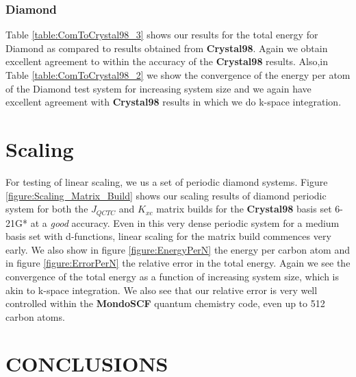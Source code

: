 \commentoutA{\documentclass[prb,aps,twocolumn,showpacs,twocolumngrid,superbib]{revtex4}}
\begin{document}
\subsubsection{Diamond}

Table \ref{table:ComToCrystal98_3} shows our results for the total
energy for Diamond as compared to results obtained from \textbf{Crystal98}.
Again we obtain excellent agreement to within the accuracy of the
\textbf{Crystal98} results.
Also,in Table \ref{table:ComToCrystal98_2}
we show the convergence of the energy per atom of the Diamond
test system for increasing system size and we again have excellent agreement
with \textbf{Crystal98} results in which we do k-space integration.

\section{Scaling}

For testing of linear scaling, we us a set of periodic diamond systems.
Figure \ref{figure:Scaling_Matrix_Build} shows our scaling results
of diamond periodic system for both the \( J_{QCTC} \) and \( K_{xc} \)
matrix builds for the \textbf{Crystal98} basis set 6-21G* \cite{C98Basis}
at a {\it good} accuracy. Even in this very dense periodic system for a medium 
basis set with d-functions, linear scaling for the matrix build commences very 
early. We also show in figure \ref{figure:EnergyPerN} the energy per carbon atom and 
in figure \ref{figure:ErrorPerN} the relative error in the total energy. 
Again we see the convergence of the total energy
as a function of increasing system size, which is akin to k-space integration. We also
see that our relative error is very well controlled within the \textbf{MondoSCF} quantum
chemistry code, even up to 512 carbon atoms.


\section{CONCLUSIONS}
\end{document}
